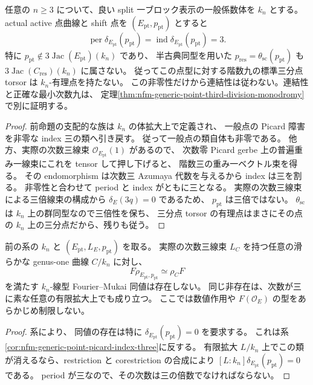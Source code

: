 \begin{corollary}
\label{cor:nfm-generic-point-picard-index-three}
任意の $n\ge3$ について、良い split 一ブロック表示の一般係数体を $k_n$ とする。
actual active 点曲線と shift 点を $(E_{\mathrm{pt}},p_{\mathrm{pt}})$ とすると
\[
 \operatorname{per}\delta_{E_{\mathrm{pt}}}(p_{\mathrm{pt}})
 =\operatorname{ind}\delta_{E_{\mathrm{pt}}}(p_{\mathrm{pt}})=3.
\]
特に $p_{\mathrm{pt}}\notin3\operatorname{Jac}(E_{\mathrm{pt}})(k_n)$ であり、
半古典同型を用いた $p_{\mathrm{res}}=\theta_{\mathrm{sc}}(p_{\mathrm{pt}})$ も
$3\operatorname{Jac}(C_{\mathrm{res}})(k_n)$ に属さない。
従ってこの点型に対する階数九の標準三分点 torsor は $k_n$-有理点を持たない。
この非零性だけから連結性は従わない。連結性と正確な最小次数九は、
定理\ref{thm:nfm-generic-point-third-division-monodromy}で別に証明する。
\end{corollary}

\begin{proof}
前命題の支配的な族は $k_n$ の体拡大上で定義され、
一般点の Picard 障害を非零な index 三の類へ引き戻す。
従って一般点の類自体も非零である。
他方、実際の次数三線束 $\mathcal O_{E_{\mathrm{pt}}}(1)$ があるので、
次数零 Picard gerbe 上の普遍重み一線束にこれを tensor して押し下げると、
階数三の重み一ベクトル束を得る。
その endomorphism は次数三 Azumaya 代数を与えるから index は三を割る。
非零性と合わせて period と index がともに三となる。
実際の次数三線束による三倍線束の構成から $\delta_E(3q)=0$ であるため、
$p_{\mathrm{pt}}$ は三倍ではない。
$\theta_{\mathrm{sc}}$ は $k_n$ 上の群同型なので三倍性を保ち、
三分点 torsor の有理点はまさにその点の $k_n$ 上の三分点だから、残りも従う。
\end{proof}

\begin{corollary}
\label{cor:nfm-generic-active-intertwiner-obstruction}
前の系の $k_n$ と $(E_{\mathrm{pt}},L_E,p_{\mathrm{pt}})$ を取る。
実際の次数三線束 $L_C$ を持つ任意の滑らかな genus-one 曲線 $C/k_n$ に対し、
\[
 F\rho_{E_{\mathrm{pt}},p_{\mathrm{pt}}}\simeq\rho_CF
\]
を満たす $k_n$-線型 Fourier--Mukai 同値は存在しない。
同じ非存在は、次数が三に素な任意の有限拡大上でも成り立つ。
ここでは数値作用や $F(\mathcal O_E)$ の型をあらかじめ制限しない。
\end{corollary}

\begin{proof}
系により、
同値の存在は特に $\delta_{E_{\mathrm{pt}}}(p_{\mathrm{pt}})=0$ を要求する。
これは系\ref{cor:nfm-generic-point-picard-index-three}に反する。
有限拡大 $L/k_n$ 上でこの類が消えるなら、restriction と corestriction の合成により
$[L:k_n]\delta_{E_{\mathrm{pt}}}(p_{\mathrm{pt}})=0$ である。
period が三なので、その次数は三の倍数でなければならない。
\end{proof}

